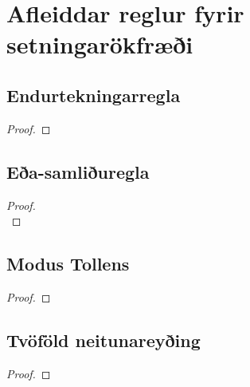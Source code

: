 \section{Afleiddar reglur fyrir setningarökfræði}
\begin{multicols}{2}
	\subsection*{Endurtekningarregla}
	
	\begin{proof}
		 
	\end{proof}

\subsection*{Eða-samliðuregla}
\begin{proof}

\\	
\end{proof}



\subsection*{Modus Tollens}

\begin{proof}
	 
\end{proof}

\subsection*{Tvöföld neitunareyðing}
	\begin{proof}
	\end{proof}
	
%
%


\end{multicols}
